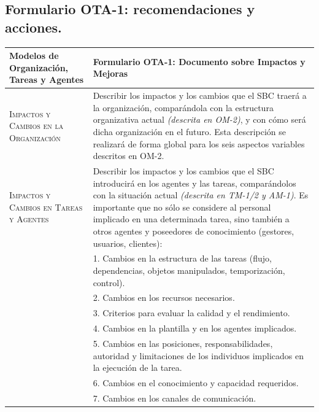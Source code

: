 \documentclass[12pt,a4paper,twoside,spanish]{article}      %
\begin{document}
        \subsection{Formulario OTA-1: recomendaciones y acciones.}
               
            \vspace*{1cm}
                    
            \begin{table}[H]
                \scriptsize
                \begin{tabularx}{\textwidth}{|p{4cm}|X|} \hline
                    \textbf{Modelos de Organización, Tareas y Agentes} & \textbf{Formulario OTA-1: Documento sobre Impactos y Mejoras}\\ \hline\hline 
                    
                    \textsc{Impactos y Cambios en la Organización} & Describir los impactos y los cambios que el SBC traerá a la organización, comparándola con la estructura organizativa actual \emph{(descrita en OM-2)}, y con cómo será dicha organización en el futuro. Esta descripción se realizará de forma global para los seis aspectos variables descritos en OM-2. \\ \hline
                    
                    \textsc{Impactos y Cambios en Tareas y Agentes} & Describir los impactos y los cambios que el SBC introducirá en los agentes y las tareas, comparándolos con la situación actual \emph{(descrita en TM-1/2 y AM-1)}. Es importante que no sólo se considere al personal implicado en una determinada tarea, sino también a otros agentes y poseedores de conocimiento (gestores, usuarios, clientes): \\
                    
                    & 1. Cambios en la estructura de las tareas (flujo, dependencias, objetos manipulados, temporización, control). \\
                    & 2. Cambios en los recursos necesarios. \\
                    & 3. Criterios para evaluar la calidad y el rendimiento.\\
                    & 4. Cambios en la plantilla y en los agentes implicados.\\
                    & 5. Cambios en las posiciones, responsabilidades, autoridad y limitaciones de los
                    individuos implicados en la ejecución de la tarea.\\
                    & 6. Cambios en el conocimiento y capacidad requeridos.\\
                    & 7. Cambios en los canales de comunicación.\\ \hline
                    

\end{tabularx}
\end{table}
\end{document}
